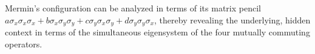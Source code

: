 \documentclass[
  twocolumn,
 showpacs,
 showkeys,
 preprintnumbers,
 amsmath,amssymb,
 aps,
 prl,
  longbibliography,
 floatfix,
 ]{revtex4-2}
\newcommand\myotimes{ }
\begin{document}
Mermin's configuration can be analyzed in terms of its matrix pencil
$
a \sigma_x \myotimes  \sigma_x \myotimes  \sigma_x + b \sigma_x \myotimes  \sigma_y \myotimes  \sigma_y + c \sigma_y \myotimes  \sigma_x \myotimes  \sigma_y + d \sigma_y \myotimes  \sigma_y \myotimes  \sigma_x
$,
thereby revealing the underlying, hidden context in terms of
the simultaneous eigensystem of the four mutually commuting operators.
%
%
\end{document}
